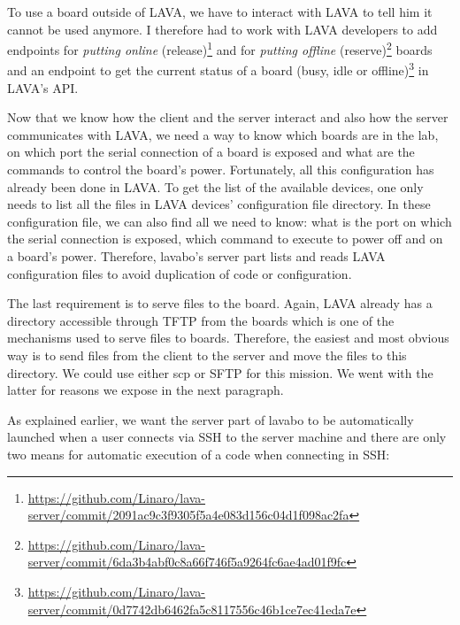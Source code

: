 To use a board outside of LAVA, we have to interact with LAVA to tell him it cannot be used anymore. I therefore had to work with LAVA developers to add endpoints for \textit{putting online} (release)\footnote{\url{https://github.com/Linaro/lava-server/commit/2091ac9c3f9305f5a4e083d156c04d1f098ac2fa}} and for \textit{putting offline} (reserve)\footnote{\url{https://github.com/Linaro/lava-server/commit/6da3b4abf0c8a66f746f5a9264fc6ae4ad01f9fc}} boards and an endpoint to get the current status of a board (busy, idle or offline)\footnote{\url{https://github.com/Linaro/lava-server/commit/0d7742db6462fa5c8117556c46b1ce7ec41eda7e}} in LAVA's API.

Now that we know how the client and the server interact and also how the server communicates with LAVA, we need a way to know which boards are in the lab, on which port the serial connection of a board is exposed and what are the commands to control the board's power. Fortunately, all this configuration has already been done in LAVA. To get the list of the available devices, one only needs to list all the files in LAVA devices' configuration file directory. In these configuration file, we can also find all we need to know: what is the port on which the serial connection is exposed, which command to execute to power off and on a board's power. Therefore, lavabo's server part lists and reads LAVA configuration files to avoid duplication of code or configuration.

The last requirement is to serve files to the board. Again, LAVA already has a directory accessible through TFTP from the boards which is one of the mechanisms used to serve files to boards. Therefore, the easiest and most obvious way is to send files from the client to the server and move the files to this directory. We could use either scp or SFTP for this mission. We went with the latter for reasons we expose in the next paragraph.

As explained earlier, we want the server part of lavabo to be automatically launched when a user connects via SSH to the server machine and there are only two means for automatic execution of a code when connecting in SSH:

